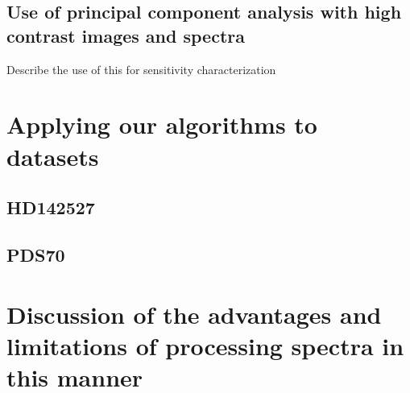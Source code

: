 \section{Use of principal component analysis with high contrast images and spectra}
Describe the use of this for sensitivity characterization

\chapter{Applying our algorithms to datasets}
\section{HD142527}
\section{PDS70}
\chapter{Discussion of the advantages and limitations of processing spectra in this manner}
